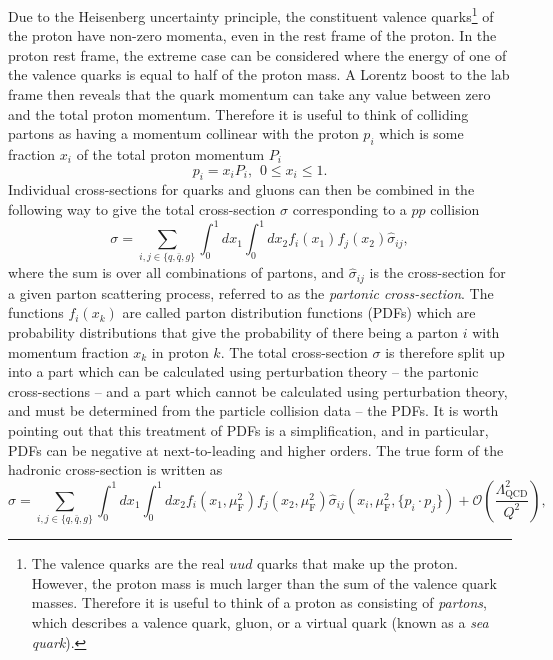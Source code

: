Due to the Heisenberg uncertainty principle, the constituent valence quarks\footnote{The valence quarks are the real $uud$ quarks that make up the proton. However, the proton mass is much larger than the sum of the valence quark masses. Therefore it is useful to think of a proton as consisting of \textit{partons}, which describes a valence quark, gluon, or a virtual quark (known as a \textit{sea quark}).} of the proton have non-zero momenta, even in the rest frame of the proton. In the proton rest frame, the extreme case can be considered where the energy of one of the valence quarks is equal to half of the proton mass. A Lorentz boost to the lab frame then reveals that the quark momentum can take any value between zero and the total proton momentum. Therefore it is useful to think of colliding partons as having a momentum collinear with the proton $p_i$ which is some fraction $x_i$ of the total proton momentum $P_i$
\begin{equation}
    p_i=x_iP_i,\hspace{5pt}0\leq x_i\leq1.
\end{equation}
Individual cross-sections for quarks and gluons can then be combined in the following way to give the total cross-section $\sigma$ corresponding to a $pp$ collision
\begin{equation}
    \sigma=\sum_{i,j\in\{q,\bar{q},g\}}\int_{0}^{1}dx_1\int_{0}^{1}dx_2f_i(x_1)f_j(x_2)\hat{\sigma}{}_{ij},
\end{equation}
where the sum is over all combinations of partons, and $\hat{\sigma}{}_{ij}$ is the cross-section for a given parton scattering process, referred to as the \textit{partonic cross-section}. The functions $f_i(x_k)$ are called parton distribution functions (PDFs) which are probability distributions that give the probability of there being a parton $i$ with momentum fraction $x_k$ in proton $k$. The total cross-section $\sigma$ is therefore split up into a part which can be calculated using perturbation theory -- the partonic cross-sections -- and a part which cannot be calculated using perturbation theory, and must be determined from the particle collision data -- the PDFs. It is worth pointing out that this treatment of PDFs is a simplification, and in particular, PDFs can be negative at next-to-leading and higher orders. The true form of the hadronic cross-section is written as
\begin{equation}\label{eq:fullfact}
    \sigma=\sum_{i,j\in\{q,\bar{q},g\}}\int_{0}^{1}dx_1\int_{0}^{1}dx_2f_i(x_1,\mu_{\mathrm{F}}^2)f_j(x_2,\mu_{\text{F}}^2)\hat{\sigma}{}_{ij}(x_i,\mu_{\mathrm{F}}^2,\{p_i\cdot p_j\})+\mathcal{O}\left(\frac{\Lambda^2_{\text{QCD}}}{Q^2}\right),
\end{equation}
